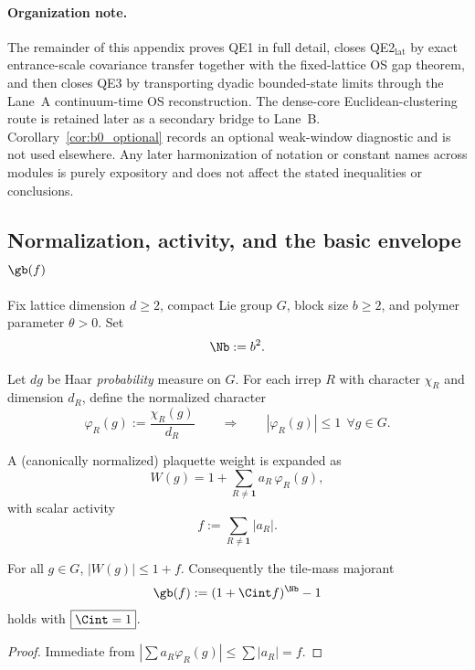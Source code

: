 \paragraph{Organization note.}
The remainder of this appendix proves QE1 in full detail, closes QE2$_{\mathrm{lat}}$ by exact entrance-scale covariance transfer together with the fixed-lattice OS gap theorem, and then closes QE3 by transporting dyadic bounded-state limits through the Lane~A continuum-time OS reconstruction.
The dense-core Euclidean-clustering route is retained later as a secondary bridge to Lane~B.
Corollary~\ref{cor:b0_optional} records an optional weak-window diagnostic and is not used elsewhere.
Any later harmonization of notation or constant names across modules is purely expository and does not affect the stated inequalities or conclusions.


\subsection{Normalization, activity, and the basic envelope \texorpdfstring{$\gb(f)$}{g\_b(f)}}

Fix lattice dimension $d\ge 2$, compact Lie group $G$, block size $b\ge 2$, and polymer parameter $\theta>0$.
Set
\begin{equation}
\Nb:=b^2.
\end{equation}

Let $dg$ be Haar \emph{probability} measure on $G$.
For each irrep $R$ with character $\chi_R$ and dimension $d_R$, define the normalized character
\begin{equation}
\varphi_R(g):=\frac{\chi_R(g)}{d_R}
\qquad\Rightarrow\qquad |\varphi_R(g)|\le 1\ \ \forall g\in G.
\end{equation}

A (canonically normalized) plaquette weight is expanded as
\begin{equation}\label{eq:W_expand}
W(g)=1+\sum_{R\ne\mathbf 1} a_R\,\varphi_R(g),
\end{equation}
with scalar activity
\begin{equation}\label{eq:f_def}
 f:=\sum_{R\ne\mathbf 1}|a_R|.
\end{equation}

\begin{lemma}\label{lem:Cint_one}
For all $g\in G$, $|W(g)|\le 1+f$.
Consequently the tile-mass majorant
\begin{equation}\label{eq:gb_def}
\gb(f):=(1+\Cint f)^{\Nb}-1
\end{equation}
holds with $\boxed{\Cint=1}$.
\end{lemma}
\begin{proof}
Immediate from $|\sum a_R\varphi_R(g)|\le \sum |a_R|=f$.
\end{proof}

